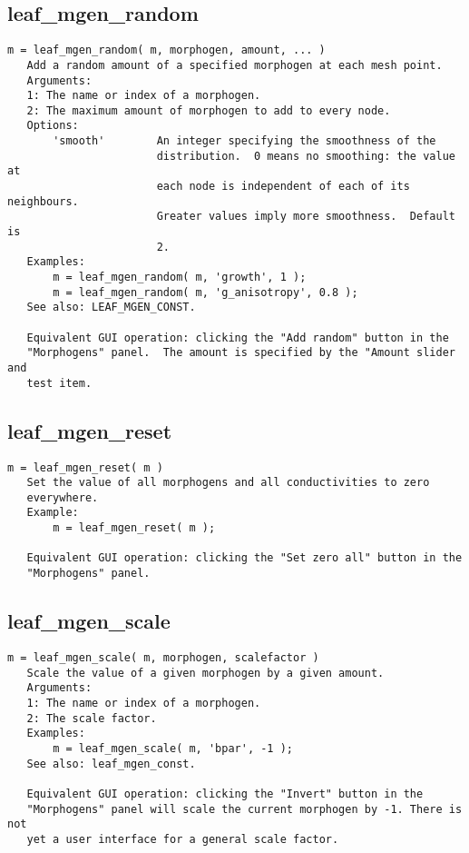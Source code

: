 \subsection{leaf\_mgen\_random}\label{section-leaf-mgen-random}

\begin{verbatim}
m = leaf_mgen_random( m, morphogen, amount, ... )
   Add a random amount of a specified morphogen at each mesh point.
   Arguments:
   1: The name or index of a morphogen.
   2: The maximum amount of morphogen to add to every node.
   Options:
       'smooth'        An integer specifying the smoothness of the
                       distribution.  0 means no smoothing: the value at
                       each node is independent of each of its neighbours.
                       Greater values imply more smoothness.  Default is
                       2.
   Examples:
       m = leaf_mgen_random( m, 'growth', 1 );
       m = leaf_mgen_random( m, 'g_anisotropy', 0.8 );
   See also: LEAF_MGEN_CONST.

   Equivalent GUI operation: clicking the "Add random" button in the
   "Morphogens" panel.  The amount is specified by the "Amount slider and
   test item.
\end{verbatim}

\subsection{leaf\_mgen\_reset}\label{section-leaf-mgen-reset}

\begin{verbatim}
m = leaf_mgen_reset( m )
   Set the value of all morphogens and all conductivities to zero
   everywhere.
   Example:
       m = leaf_mgen_reset( m );

   Equivalent GUI operation: clicking the "Set zero all" button in the
   "Morphogens" panel.
\end{verbatim}

\subsection{leaf\_mgen\_scale}\label{section-leaf-mgen-scale}

\begin{verbatim}
m = leaf_mgen_scale( m, morphogen, scalefactor )
   Scale the value of a given morphogen by a given amount.
   Arguments:
   1: The name or index of a morphogen.
   2: The scale factor.
   Examples:
       m = leaf_mgen_scale( m, 'bpar', -1 );
   See also: leaf_mgen_const.

   Equivalent GUI operation: clicking the "Invert" button in the
   "Morphogens" panel will scale the current morphogen by -1. There is not
   yet a user interface for a general scale factor.
\end{verbatim}

